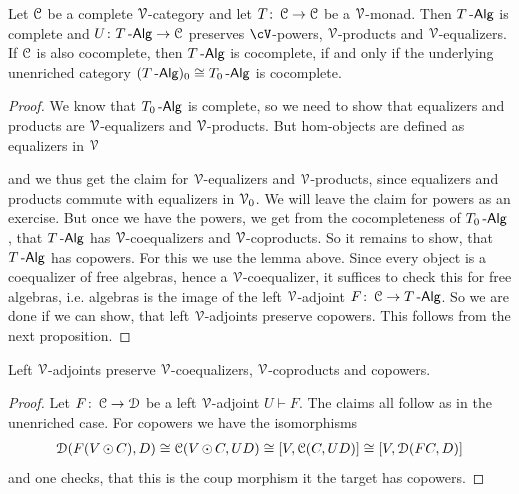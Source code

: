 \documentclass[a4paper,11pt,oneside,openany]{scrbook}
\begin{document}
\begin{thm}
	Let $\C$ be a complete $\V$-category and let $T \from \C \to \C$ be a $\V$-monad. Then $T\Alg$ is complete and $U \from T\Alg \to \C$ preserves $\cV$-powers,
	$\V$-products and $\V$-equalizers. If $\C$ is also cocomplete, then $T\Alg$ is cocomplete, if and only if the underlying unenriched category
	$(T\Alg)_{0} \iso T_{0}\Alg$ is cocomplete.
\end{thm}

\begin{proof}
	We know that $T_{0}\Alg$ is complete, so we need to show that equalizers and products are $\V$-equalizers and $\V$-products. But hom-objects are
	defined as equalizers in $\V$
	\begin{center}
	\end{center}
	and we thus get the claim for $\V$-equalizers and $\V$-products, since equalizers and products commute with equalizers in $\V_{0}$. We will leave the
	claim for powers as an exercise. But once we have the powers, we get from the cocompleteness of $T_{0}\Alg$, that $T\Alg$ has $\V$-coequalizers and
	$\V$-coproducts. So it remains to show, that $T\Alg$ has copowers. For this we use the lemma above. Since every object is a coequalizer of free
	algebras, hence a $\V$-coequalizer, it suffices to check this for free algebras, i.e. algebras is the image of the left $\V$-adjoint
	$F \from \C \to T\Alg$. So we are done if we can show, that left $\V$-adjoints preserve copowers. This follows from the next proposition.
\end{proof}

\begin{prop}
	Left $\V$-adjoints preserve $\V$-coequalizers, $\V$-coproducts and copowers.
\end{prop}

\begin{proof}
	Let $F \from \C \to \D$ be a left $\V$-adjoint $U\vdash F$. The claims all follow as in the unenriched case. For copowers we have the isomorphisms
	\begin{align*}
		\D(F(V\copw C),D) \iso \C(V\copw C,UD) \iso \lbrack V,\C(C,UD) \rbrack \iso \lbrack V,\D(FC,D) \rbrack
	\end{align*}
	and one checks, that this is the coup morphism it the target has copowers.
\end{proof}
\end{document}
